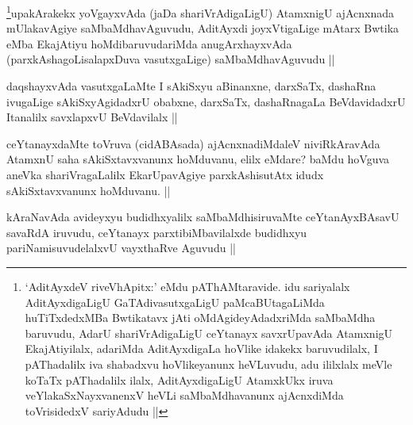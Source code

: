 \begin{artha}
\footnote{`AditAyxdeV riveVhApitx:' eMdu pAThAMtaravide. idu sariyalalx AditAyxdigaLigU GaTAdivasutxgaLigU paMcaBUtagaLiMda huTiTxdedxMBa Bwtikatavx jAti oMdAgideyAdadxriMda saMbaMdha baruvudu, AdarU shariVrAdigaLigU ceYtanayx savxrUpavAda AtamxnigU EkajAtiyilalx, adariMda AditAyxdigaLa hoVlike idakekx baruvudilalx, I pAThadalilx iva shabadxvu hoVlikeyanunx heVLuvudu, adu ililxlalx meVle koTaTx pAThadalilx ilalx, AditAyxdigaLigU AtamxkUkx iruva veYlakaSxNayxvanenxV heVLi saMbaMdhavanunx ajAcnxdiMda toVrisidedxV sariyAdudu ||}upakArakekx yoVgayxvAda (jaDa shariVrAdigaLigU) AtamxnigU ajAcnxnada mUlakavAgiye saMbaMdhavAguvudu, AditAyxdi joyxVtigaLige mAtarx Bwtika eMba EkajAtiyu hoMdibaruvudariMda anugArxhayxvAda (parxkAshagoLisalapxDuva vasutxgaLige) saMbaMdhavAguvudu ||
\end{artha}

\begin{artha}
daqshayxvAda vasutxgaLaMte I sAkiSxyu aBinanxne, darxSaTx, dashaRna ivugaLige sAkiSxyAgidadxrU obabxne, darxSaTx, dashaRnagaLa BeVdavidadxrU Itanalilx savxlapxvU BeVdavilalx ||
\end{artha}

\begin{artha}
ceYtanayxdaMte toVruva (cidABAsada) ajAcnxnadiMdaleV niviRkAravAda AtamxnU saha sAkiSxtavxvanunx hoMduvanu, elilx eMdare? baMdu hoVguva aneVka shariVragaLalilx EkarUpavAgiye parxkAshisutAtx idudx sAkiSxtavxvanunx hoMduvanu. ||
\end{artha}

\begin{artha}
kAraNavAda avideyxyu budidhxyalilx saMbaMdhisiruvaMte ceYtanAyxBAsavU savaRdA iruvudu, ceYtanayx parxtibiMbavilalxde budidhxyu pariNamisuvudelalxvU vayxthaRve Aguvudu ||
\end{artha}

